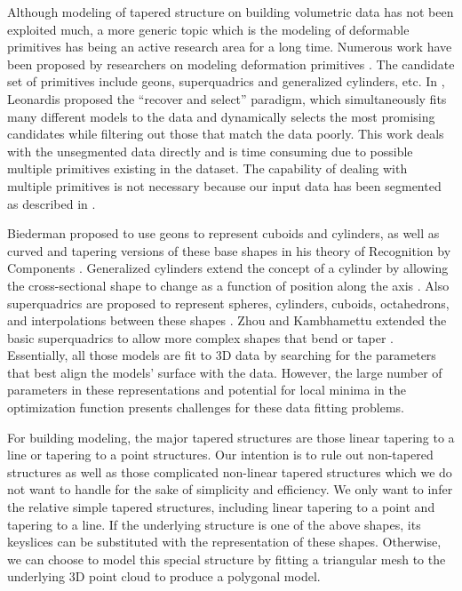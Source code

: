 Although modeling of tapered structure on building volumetric data
has not been exploited much,
a more generic topic which is the modeling of deformable primitives
has being an active research area for a long time.
Numerous work have been proposed by researchers on modeling deformation
primitives \cite{TSI_LJS,TSI_ZY,TSI_CJB}.
The candidate set of primitives include geons, superquadrics and
generalized cylinders, etc.
In \cite{TSI_LJS}, Leonardis proposed the ``recover and select''
paradigm, which simultaneously fits
many different models to the data and dynamically selects the most
promising candidates while filtering out those that match the data poorly.
This work deals with the unsegmented data directly and
is time consuming due to possible multiple primitives existing in the dataset.
The capability of dealing with multiple primitives is not necessary
because our input data has been segmented as described in .

Biederman proposed to use geons to
represent cuboids and cylinders,
as well as curved and tapering versions of these base shapes in his
theory of Recognition by Components \cite{TSI_IB}.
Generalized cylinders extend the concept of a cylinder
by allowing the cross-sectional shape to change
as a function of position along the axis \cite{TSI_TB}.
Also superquadrics are proposed to represent
spheres, cylinders, cuboids, octahedrons,
and interpolations between these shapes \cite{TSI_AHB,TSI_AHB2}.
Zhou and Kambhamettu extended the basic superquadrics
to allow more complex shapes that bend or taper \cite{TSI_ZK}.
Essentially, all those models are fit to 3D data by searching for the parameters
that best align the models' surface with the data.
However, the large number of parameters in these representations
and potential for local minima in the optimization function
presents challenges for these data fitting problems.


For building modeling, the major tapered structures
are those linear tapering to a line or tapering to a point structures.
Our intention is to rule out non-tapered structures as well as
those complicated non-linear tapered structures which
we do not want to handle for the sake of simplicity and efficiency.
We only want to infer the relative simple tapered structures,
including linear tapering to a point and tapering to a line.
If the underlying structure is one of the above shapes,
its keyslices can be substituted with the representation of these shapes.
Otherwise, we can choose to model this special structure by fitting a
triangular mesh to the underlying 3D point cloud to produce a polygonal model.

